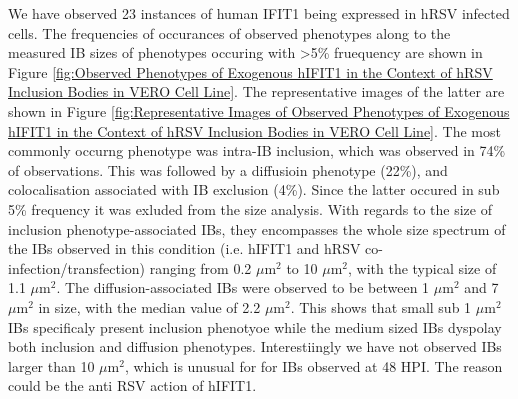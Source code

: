 We have observed 23 instances of human IFIT1 being expressed in hRSV infected cells. The frequencies of occurances of observed phenotypes along to the measured IB sizes of phenotypes occuring with >5\% fruequency are shown in Figure \ref{fig:Observed Phenotypes of Exogenous hIFIT1 in the Context of hRSV Inclusion Bodies in VERO Cell Line}. The representative images of the latter are shown in Figure \ref{fig:Representative Images of Observed Phenotypes of Exogenous hIFIT1 in the Context of hRSV Inclusion Bodies in VERO Cell Line}. The most commonly occurng phenotype was intra-IB inclusion, which was observed in 74\% of observations. This was followed by a diffusioin phenotype (22\%), and colocalisation associated with IB exclusion (4\%). Since the latter occured in sub 5\% frequency it was exluded from the size analysis. With regards to the size of inclusion phenotype-associated IBs, they encompasses the whole size spectrum of the IBs observed in this condition (i.e. hIFIT1 and hRSV co-infection/transfection) ranging from 0.2 \(\mu \mbox{m}^2\) to 10 \(\mu \mbox{m}^2\), with the typical size of 1.1 \(\mu \mbox{m}^2\). The diffusion-associated IBs were observed to be between 1 \(\mu \mbox{m}^2\) and 7 \(\mu \mbox{m}^2\) in size, with the median value of 2.2 \(\mu \mbox{m}^2\). This shows that small sub 1 \(\mu \mbox{m}^2\) IBs specificaly present inclusion phenotyoe while the medium sized IBs dyspolay both inclusion and diffusion phenotypes. Interestiingly we have not observed IBs larger than 10 \(\mu \mbox{m}^2\), which is unusual for for IBs observed at 48 HPI. The reason could be the anti RSV action of hIFIT1.

